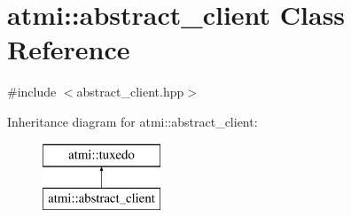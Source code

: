 \hypertarget{classatmi_1_1abstract__client}{\section{atmi\+:\+:abstract\+\_\+client Class Reference}
\label{classatmi_1_1abstract__client}
}


{\ttfamily \#include $<$abstract\+\_\+client.\+hpp$>$}

Inheritance diagram for atmi\+:\+:abstract\+\_\+client\+:\begin{figure}[H]
\begin{center}
\leavevmode
\includegraphics[height=2.000000cm]{classatmi_1_1abstract__client}
\end{center}
\end{figure}
